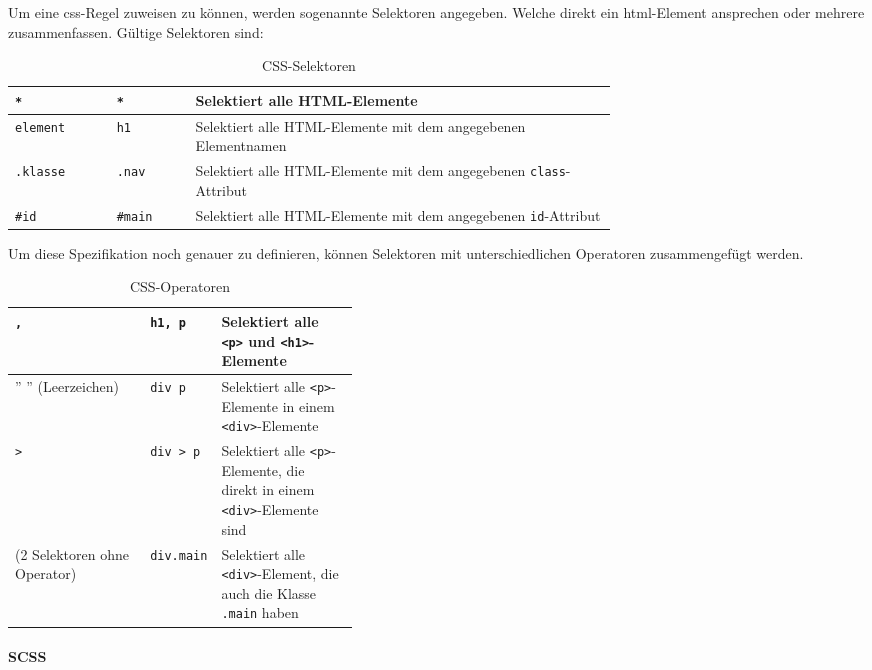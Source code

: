 Um eine \gls{css}-Regel zuweisen zu können, werden sogenannte Selektoren angegeben. Welche direkt ein \gls{html}-Element ansprechen oder mehrere zusammenfassen. Gültige Selektoren sind:

\begin{table}[H]
    \centering
    \begin{tabular}{|l|l|p{0.7\linewidth}|}
        \hline
        \lstinline|*| & \lstinline|*| & Selektiert alle HTML-Elemente                                                      \\ \hline
        \lstinline|element| & \lstinline|h1| & Selektiert alle HTML-Elemente mit dem angegebenen Elementnamen                     \\ \hline
        \lstinline|.klasse| & \lstinline|.nav| & Selektiert alle HTML-Elemente mit dem angegebenen \lstinline|class|-Attribut \\ \hline
        \lstinline|#id| & \lstinline|#main| & Selektiert alle HTML-Elemente mit dem angegebenen \lstinline|id|-Attribut \\ \hline
    \end{tabular}
    \caption{CSS-Selektoren}
\end{table}

Um diese Spezifikation noch genauer zu definieren, können Selektoren mit unterschiedlichen Operatoren zusammengefügt werden.

\begin{table}[H]
    \centering
    \begin{tabular}{|l|l|p{0.4\linewidth}|}
        \hline
        \lstinline|,|      & \lstinline|h1, p| & Selektiert alle \lstinline|<p>| und \lstinline|<h1>|-Elemente                                \\ \hline
        '' '' (Leerzeichen)          & \lstinline|div p| & Selektiert alle \lstinline|<p>|-Elemente in einem \lstinline|<div>|-Elemente                  \\ \hline
        \lstinline|>|      & \lstinline|div > p| & Selektiert alle \lstinline|<p>|-Elemente, die direkt in einem \lstinline|<div>|-Elemente sind \\ \hline
        (2 Selektoren ohne Operator) & \lstinline|div.main| & Selektiert alle \lstinline|<div>|-Element, die auch die Klasse \lstinline|.main| haben          \\ \hline
    \end{tabular}
    \caption{CSS-Operatoren}
\end{table}

\paragraph{SCSS}

